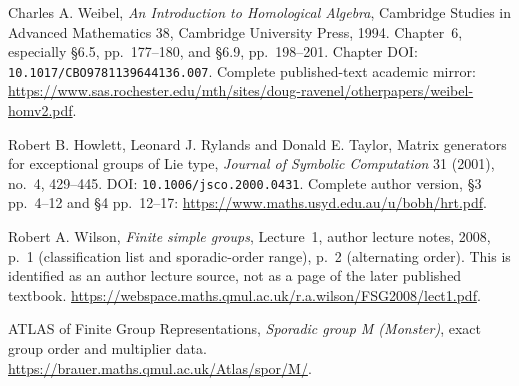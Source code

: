 Charles A. Weibel,
\emph{An Introduction to Homological Algebra},
Cambridge Studies in Advanced Mathematics 38,
Cambridge University Press, 1994.
Chapter~6, especially \S6.5, pp.~177--180, and \S6.9, pp.~198--201.
Chapter DOI: \texttt{10.1017/CBO9781139644136.007}.
Complete published-text academic mirror:
\url{https://www.sas.rochester.edu/mth/sites/doug-ravenel/otherpapers/weibel-homv2.pdf}.

Robert B. Howlett, Leonard J. Rylands and Donald E. Taylor,
Matrix generators for exceptional groups of Lie type,
\emph{Journal of Symbolic Computation} 31 (2001), no.~4, 429--445.
DOI: \texttt{10.1006/jsco.2000.0431}.
Complete author version, \S3 pp.~4--12 and \S4 pp.~12--17:
\url{https://www.maths.usyd.edu.au/u/bobh/hrt.pdf}.

Robert A. Wilson,
\emph{Finite simple groups}, Lecture~1, author lecture notes, 2008,
p.~1 (classification list and sporadic-order range), p.~2 (alternating order).
This is identified as an author lecture source, not as a page of the
later published textbook.
\url{https://webspace.maths.qmul.ac.uk/r.a.wilson/FSG2008/lect1.pdf}.

ATLAS of Finite Group Representations,
\emph{Sporadic group M (Monster)}, exact group order and multiplier data.
\url{https://brauer.maths.qmul.ac.uk/Atlas/spor/M/}.
